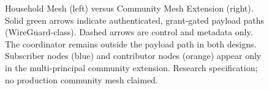 \documentclass{article}
\begin{document}
\begin{figure}[htbp]
\caption{Household Mesh (left) versus Community Mesh Extension (right). Solid green arrows indicate authenticated, grant-gated payload paths (WireGuard-class). Dashed arrows are control and metadata only. The coordinator remains outside the payload path in both designs. Subscriber nodes (blue) and contributor nodes (orange) appear only in the multi-principal community extension. Research specification; no production community mesh claimed.}
\label{fig:architecture}
\end{figure}
\end{document}
